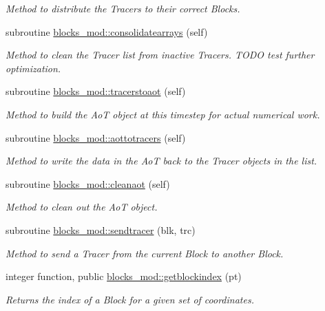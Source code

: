 \begin{DoxyCompactItemize}
\begin{DoxyCompactList}\small\item\em Method to distribute the Tracers to their correct Blocks. \end{DoxyCompactList}\item 
subroutine \mbox{\hyperlink{namespaceblocks__mod_a25ff530b5125e4cee5b1f474b2491883}{blocks\+\_\+mod\+::consolidatearrays}} (self)
\begin{DoxyCompactList}\small\item\em Method to clean the Tracer list from inactive Tracers. T\+O\+DO test further optimization. \end{DoxyCompactList}\item 
subroutine \mbox{\hyperlink{namespaceblocks__mod_ae7afa742f8f89a6a8afdefb7f8c87efd}{blocks\+\_\+mod\+::tracerstoaot}} (self)
\begin{DoxyCompactList}\small\item\em Method to build the AoT object at this timestep for actual numerical work. \end{DoxyCompactList}\item 
subroutine \mbox{\hyperlink{namespaceblocks__mod_a27c7e788c5f3979bfe9d43aad138286a}{blocks\+\_\+mod\+::aottotracers}} (self)
\begin{DoxyCompactList}\small\item\em Method to write the data in the AoT back to the Tracer objects in the list. \end{DoxyCompactList}\item 
subroutine \mbox{\hyperlink{namespaceblocks__mod_a6cc313e046daa2720cbca810d083faa0}{blocks\+\_\+mod\+::cleanaot}} (self)
\begin{DoxyCompactList}\small\item\em Method to clean out the AoT object. \end{DoxyCompactList}\item 
subroutine \mbox{\hyperlink{namespaceblocks__mod_a5a9992de40470e417ec8e40e688f6a0e}{blocks\+\_\+mod\+::sendtracer}} (blk, trc)
\begin{DoxyCompactList}\small\item\em Method to send a Tracer from the current Block to another Block. \end{DoxyCompactList}\item 
integer function, public \mbox{\hyperlink{namespaceblocks__mod_a62e8fb0d6b2535b4499c7a4d848c24ba}{blocks\+\_\+mod\+::getblockindex}} (pt)
\begin{DoxyCompactList}\small\item\em Returns the index of a Block for a given set of coordinates. \end{DoxyCompactList}\item 

\end{DoxyCompactItemize}
